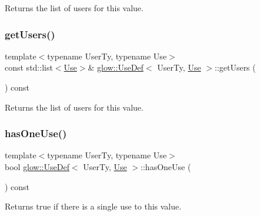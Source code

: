 \begin{DoxyReturn}{Returns}
the list of users for this value. 
\end{DoxyReturn}
\mbox{\label{classglow_1_1_use_def_a15a07afe24f9546f4ea841ffefe46508}} 
\subsubsection{\texorpdfstring{get\+Users()}{getUsers()}\hspace{0.1cm}{\footnotesize\ttfamily [2/2]}}
{\footnotesize\ttfamily template$<$typename User\+Ty, typename Use$>$ \\
const std\+::list$<$\hyperlink{structglow_1_1_use}{Use}$>$\& \hyperlink{classglow_1_1_use_def}{glow\+::\+Use\+Def}$<$ User\+Ty, \hyperlink{structglow_1_1_use}{Use} $>$\+::get\+Users (\begin{DoxyParamCaption}{ }\end{DoxyParamCaption}) const\hspace{0.3cm}{\ttfamily [inline]}}

\begin{DoxyReturn}{Returns}
the list of users for this value. 
\end{DoxyReturn}
\mbox{\label{classglow_1_1_use_def_aff3381f7085f27c6053426920b42147c}} 
\subsubsection{\texorpdfstring{has\+One\+Use()}{hasOneUse()}}
{\footnotesize\ttfamily template$<$typename User\+Ty, typename Use$>$ \\
bool \hyperlink{classglow_1_1_use_def}{glow\+::\+Use\+Def}$<$ User\+Ty, \hyperlink{structglow_1_1_use}{Use} $>$\+::has\+One\+Use (\begin{DoxyParamCaption}{ }\end{DoxyParamCaption}) const\hspace{0.3cm}{\ttfamily [inline]}}

\begin{DoxyReturn}{Returns}
true if there is a single use to this value. 
\end{DoxyReturn}
\mbox{\label{classglow_1_1_use_def_a57e259466504c1b589ff4f84dc5bcbb9}} 
